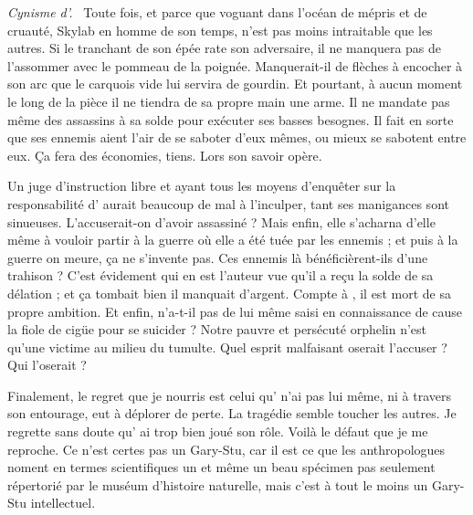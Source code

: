 {\em\normalsize Cynisme d’\elena{}.}~
Toute fois, et parce que voguant dans l’océan de mépris et de cruauté, \elena{} Skylab en homme de son temps, n’est pas moins intraitable que les autres. Si le tranchant de son épée rate son adversaire, il ne manquera pas de l’assommer avec le pommeau de la poignée. Manquerait-il de flèches à encocher à son arc que le carquois vide lui servira de gourdin. Et pourtant, à aucun moment le long de la pièce il ne tiendra de sa propre main une arme. Il ne mandate pas même des assassins à sa solde pour exécuter ses basses besognes. Il fait en sorte que ses ennemis aient l’air de se saboter d’eux mêmes, ou mieux se sabotent entre eux. Ça fera des économies, tiens. Lors son savoir opère.

Un juge d’instruction libre et ayant tous les moyens d’enquêter sur la responsabilité d’\elena{} aurait beaucoup de mal à l’inculper, tant ses manigances sont sinueuses. L’accuserait-on d’avoir assassiné \princesse ? Mais enfin, elle s’acharna d’elle même à vouloir partir à la guerre où elle a été tuée par les ennemis ; et puis à la guerre on meure, ça ne s’invente pas. Ces ennemis là bénéficièrent-ils d’une trahison ? C’est évidement \vladimir{} qui en est l’auteur vue qu’il a reçu la solde de sa délation ; et ça tombait bien il manquait d’argent. Compte à \general, il est mort de sa propre ambition. Et enfin, \roi{} n’a-t-il pas de lui même saisi en connaissance de cause la fiole de cigüe pour se suicider ? Notre pauvre et persécuté orphelin \elena{} n’est qu’une victime au milieu du tumulte. Quel esprit malfaisant oserait l’accuser ? Qui l’oserait ?

Finalement, le regret que je nourris est celui qu’\elena{} n’ai pas lui même, ni à travers son entourage, eut à déplorer de perte. La tragédie semble toucher les autres. Je regrette sans doute qu’\elena{} ai trop bien joué son rôle. Voilà le défaut que je me reproche. Ce n’est certes pas un Gary-Stu, car il est ce que les anthropologues noment en termes scientifiques un  et même un beau spécimen pas seulement répertorié par le muséum d’histoire naturelle, mais c’est à tout le moins un Gary-Stu intellectuel.



